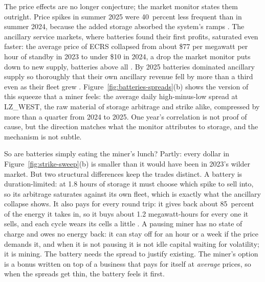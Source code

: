 The price effects are no longer conjecture; the market monitor states them outright. Price spikes in summer 2025 were 40~percent less frequent than in summer 2024, because the added storage absorbed the system's ramps \autocite{potomac2026somercot}. %
The ancillary service markets, where batteries found their first profits, saturated even faster: the average price of ECRS collapsed from about \$77 per megawatt per hour of standby in 2023 to under \$10 in 2024, a drop the market monitor puts down to new supply, batteries above all \autocite{potomac2024som}. %
By 2025 batteries dominated ancillary supply so thoroughly that their own ancillary revenue fell by more than a third even as their fleet grew \autocite{potomac2026somercot}. %
Figure~\ref{fig:batteries-spreads}(b) shows the version of this squeeze that a miner feels: the average daily high-minus-low spread at LZ\_WEST, the raw material of storage arbitrage and strike alike, compressed by more than a quarter from 2024 to 2025. One year's correlation is not proof of cause, but the direction matches what the monitor attributes to storage, and the mechanism is not subtle.

So are batteries simply eating the miner's lunch? Partly: every dollar in Figure~\ref{fig:strike-sweep}(b) is smaller than it would have been in 2023's wilder market. But two structural differences keep the trades distinct. A battery is duration-limited: at 1.8 hours of storage it must choose which spike to sell into, so its arbitrage saturates against its own fleet, which is exactly what the ancillary collapse shows. %
It also pays for every round trip: it gives back about 85~percent of the energy it takes in, so it buys about 1.2 megawatt-hours for every one it sells, and each cycle wears its cells a little \autocite{potomac2026somercot,nlr2025atbbattery}. %
A pausing miner has no state of charge and owes no energy back: it can stay off for an hour or a week if the price demands it, and when it is not pausing it is not idle capital waiting for volatility; it is mining. The battery needs the spread to justify existing. The miner's option is a bonus written on top of a business that pays for itself at \emph{average} prices, so when the spreads get thin, the battery feels it first.

